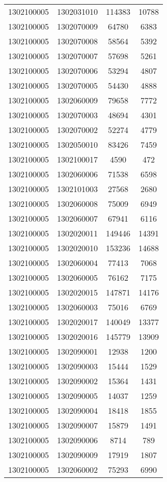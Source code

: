 \begin{longtable}{llcc}
1302100005 & 1302031010 & 114383 & 10788\\
1302100005 & 1302070009 & 64780 & 6383\\
1302100005 & 1302070008 & 58564 & 5392\\
1302100005 & 1302070007 & 57698 & 5261\\
1302100005 & 1302070006 & 53294 & 4807\\
1302100005 & 1302070005 & 54430 & 4888\\
1302100005 & 1302060009 & 79658 & 7772\\
1302100005 & 1302070003 & 48694 & 4301\\
1302100005 & 1302070002 & 52274 & 4779\\
1302100005 & 1302050010 & 83426 & 7459\\
1302100005 & 1302100017 & 4590 & 472\\
1302100005 & 1302060006 & 71538 & 6598\\
1302100005 & 1302101003 & 27568 & 2680\\
1302100005 & 1302060008 & 75009 & 6949\\
1302100005 & 1302060007 & 67941 & 6116\\
1302100005 & 1302020011 & 149446 & 14391\\
1302100005 & 1302020010 & 153236 & 14688\\
1302100005 & 1302060004 & 77413 & 7068\\
1302100005 & 1302060005 & 76162 & 7175\\
1302100005 & 1302020015 & 147871 & 14176\\
1302100005 & 1302060003 & 75016 & 6769\\
1302100005 & 1302020017 & 140049 & 13377\\
1302100005 & 1302020016 & 145779 & 13909\\
1302100005 & 1302090001 & 12938 & 1200\\
1302100005 & 1302090003 & 15444 & 1529\\
1302100005 & 1302090002 & 15364 & 1431\\
1302100005 & 1302090005 & 14037 & 1259\\
1302100005 & 1302090004 & 18418 & 1855\\
1302100005 & 1302090007 & 15879 & 1491\\
1302100005 & 1302090006 & 8714 & 789\\
1302100005 & 1302090009 & 17919 & 1807\\
1302100005 & 1302060002 & 75293 & 6990\\

\end{longtable}
